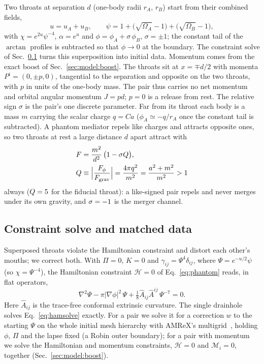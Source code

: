 \documentclass[twocolumn,floatfix,aps,prd,superscriptaddress,nofootinbib]{revtex4-2}
\begin{document}
Two throats at separation $d$ (one-body radii $r_A$, $r_B$) start from their combined fields,
\begin{equation}
u = u_A + u_B,\qquad
\psi = 1 + \bigl(\sqrt{\Omega_A}-1\bigr) + \bigl(\sqrt{\Omega_B}-1\bigr),
\end{equation}
with $\chi = e^{2u}\psi^{-4}$, $\alpha = e^{u}$ and $\phi = \phi_A + \sigma\,\phi_B$, $\sigma=\pm1$; the constant tail of the $\arctan$ profiles is subtracted so that $\phi\to0$ at the boundary. The constraint solve of Sec.~\ref{sec:model:solve} turns this superposition into initial data. Momentum comes from the exact boost of Sec.~\ref{sec:model:boost}. The throats sit at $x=\mp d/2$ with momenta $P^i=(0,\pm p,0)$, tangential to the separation and opposite on the two throats, with $p$ in units of the one-body mass. The pair thus carries no net momentum and orbital angular momentum $J=pd$; $p=0$ is a release from rest. The relative sign $\sigma$ is the pair's one discrete parameter. Far from its throat each body is a mass $m$ carrying the scalar charge $q=Ca$ ($\phi_A\simeq-q/r_A$ once the constant tail is subtracted). A phantom mediator repels like charges and attracts opposite ones, so two throats at rest a large distance $d$ apart attract with
\begin{equation}
\begin{split}
F&=\frac{m^2}{d^2}\,\bigl(1-\sigma Q\bigr),\\
Q&\equiv\Bigl|\frac{F_\phi}{F_{\rm grav}}\Bigr|=\frac{4\pi q^2}{m^2}=\frac{a^2+m^2}{m^2}>1
\end{split}
\label{eq:force}
\end{equation}
always ($Q=5$ for the fiducial throat): a like-signed pair repels and never merges under its own gravity, and $\sigma=-1$ is the merger channel.

\subsection{Constraint solve and matched data}
\label{sec:model:solve}

Superposed throats violate the Hamiltonian constraint and distort each other's mouths; we correct both. With $\Pi=0$, $K=0$ and $\gamma_{ij}=\Psi^4\delta_{ij}$, where $\Psi=e^{-u/2}\psi$ (so $\chi=\Psi^{-4}$), the Hamiltonian constraint $\mathcal H=0$ of Eq.~\eqref{eq:phantom} reads, in flat operators,
\begin{equation}
\nabla^2\Psi-\pi|\nabla\phi|^2\,\Psi+\tfrac18\hat A_{ij}\hat A^{ij}\,\Psi^{-7}=0 .
\label{eq:hamsolve}
\end{equation}
Here $\hat A_{ij}$ is the trace-free conformal extrinsic curvature. The single drainhole solves Eq.~\eqref{eq:hamsolve} exactly. For a pair we solve it for a correction $w$ to the starting $\Psi$ on the whole initial mesh hierarchy with AMReX's multigrid~\cite{amrex}, holding $\phi$, $\Pi$ and the lapse fixed (a Robin outer boundary); for a pair with momentum we solve the Hamiltonian and momentum constraints, $\mathcal H=0$ and $\mathcal M_i=0$, together (Sec.~\ref{sec:model:boost}).
\end{document}

